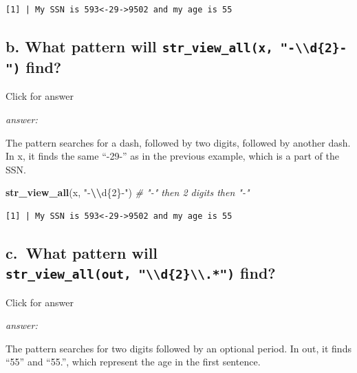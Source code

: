 \documentclass[
]{book}
\newenvironment{Shaded}{\begin{snugshade}}{\end{snugshade}}
\newcommand{\CommentTok}[1]{\textcolor[rgb]{0.56,0.35,0.01}{\textit{#1}}}
\newcommand{\FunctionTok}[1]{\textcolor[rgb]{0.13,0.29,0.53}{\textbf{#1}}}
\newcommand{\NormalTok}[1]{#1}
\newcommand{\SpecialCharTok}[1]{\textcolor[rgb]{0.81,0.36,0.00}{\textbf{#1}}}
\newcommand{\StringTok}[1]{\textcolor[rgb]{0.31,0.60,0.02}{#1}}
\begin{document}
\begin{verbatim}
[1] | My SSN is 593<-29->9502 and my age is 55
\end{verbatim}

\hypertarget{b.-what-pattern-will-str_view_allx--d2--find}{%
\subsection{\texorpdfstring{b. What pattern will \texttt{str\_view\_all(x,\ "-\textbackslash{}\textbackslash{}d\{2\}-")} find?}{b. What pattern will str\_view\_all(x, "-\textbackslash\textbackslash d\{2\}-") find?}}\label{b.-what-pattern-will-str_view_allx--d2--find}}

Click for answer

\emph{answer:}

The pattern searches for a dash, followed by two digits, followed by another dash. In x, it finds the same ``-29-'' as in the previous example, which is a part of the SSN.

\begin{Shaded}
\begin{Highlighting}[]
\FunctionTok{str\_view\_all}\NormalTok{(x, }\StringTok{"{-}}\SpecialCharTok{\textbackslash{}\textbackslash{}}\StringTok{d\{2\}{-}"}\NormalTok{)  }\CommentTok{\# "{-}" then 2 digits then "{-}"}
\end{Highlighting}
\end{Shaded}

\begin{verbatim}
[1] | My SSN is 593<-29->9502 and my age is 55
\end{verbatim}

\hypertarget{c.-what-pattern-will-str_view_allout-d2.-find}{%
\subsection{\texorpdfstring{c.~What pattern will \texttt{str\_view\_all(out,\ "\textbackslash{}\textbackslash{}d\{2\}\textbackslash{}\textbackslash{}.*")} find?}{c.~What pattern will str\_view\_all(out, "\textbackslash\textbackslash d\{2\}\textbackslash\textbackslash.*") find?}}\label{c.-what-pattern-will-str_view_allout-d2.-find}}

Click for answer

\emph{answer:}

The pattern searches for two digits followed by an optional period. In out, it finds ``55'' and ``55.'', which represent the age in the first sentence.
\end{document}
